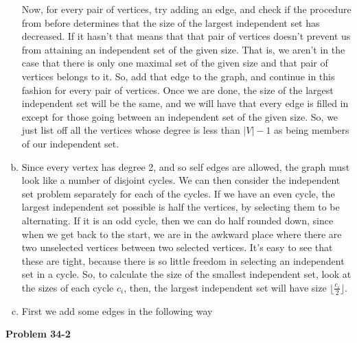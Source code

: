 \documentclass{article}
\begin{document}
\begin{enumerate}[a)]
Now, for every pair of vertices, try adding an edge, and check if the procedure from before determines that the size of the largest independent set has decreased. If it hasn't that means that that pair of vertices doesn't prevent us from attaining an independent set of the given size. That is, we aren't in the case that there is only one maximal set of the given size and that pair of vertices belongs to it. So, add that edge to the graph, and continue in this fashion for every pair of vertices. Once we are done, the size of the largest independent set will be the same, and we will have that every edge is filled in except for those going between an independent set of the given size. So, we just list off all the vertices whose degree is less than $|V|-1$ as being members of our independent set.
\item
Since every vertex has degree 2, and so self edges are allowed, the graph must look like a number of disjoint cycles. We can then consider the independent set problem separately for each of the cycles. If we have an even cycle, the largest independent set possible is half the vertices, by selecting them to be alternating. If it is an odd cycle, then we can do half rounded down, since when we get back to the start, we are in the awkward place where there are two unselected vertices between two selected vertices. It's easy to see that these are tight, because there is so little freedom in selecting an independent set in a cycle. So, to calculate the size of the smallest independent set, look at the sizes of each cycle $c_i$, then, the largest independent set will have size $\lfloor \frac{c_i}{2}\rfloor$.
\item
First we add some edges in the following way
\end{enumerate}

\noindent\textbf{Problem 34-2}\\
\end{document}
